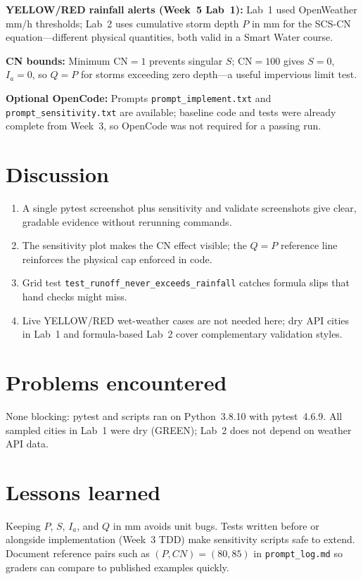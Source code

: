 \documentclass[11pt,a4paper]{article}
\begin{document}
\textbf{YELLOW/RED rainfall alerts (Week~5 Lab~1):} Lab~1 used OpenWeather mm/h thresholds; Lab~2 uses cumulative storm depth $P$ in mm for the SCS-CN equation---different physical quantities, both valid in a Smart Water course.

\textbf{CN bounds:} Minimum CN${=}1$ prevents singular $S$; CN${=}100$ gives $S{=}0$, $I_a{=}0$, so $Q{=}P$ for storms exceeding zero depth---a useful impervious limit test.

\textbf{Optional OpenCode:} Prompts \texttt{prompt\_implement.txt} and \texttt{prompt\_sensitivity.txt} are available; baseline code and tests were already complete from Week~3, so OpenCode was not required for a passing run.

\section{Discussion}
\begin{enumerate}[noitemsep]
  \item A single pytest screenshot plus sensitivity and validate screenshots give clear, gradable evidence without rerunning commands.
  \item The sensitivity plot makes the CN effect visible; the $Q=P$ reference line reinforces the physical cap enforced in code.
  \item Grid test \texttt{test\_runoff\_never\_exceeds\_rainfall} catches formula slips that hand checks might miss.
  \item Live YELLOW/RED wet-weather cases are not needed here; dry API cities in Lab~1 and formula-based Lab~2 cover complementary validation styles.
\end{enumerate}

\section{Problems encountered}
None blocking: pytest and scripts ran on Python~3.8.10 with pytest~4.6.9. All sampled cities in Lab~1 were dry (GREEN); Lab~2 does not depend on weather API data.

\section{Lessons learned}
Keeping $P$, $S$, $I_a$, and $Q$ in mm avoids unit bugs. Tests written before or alongside implementation (Week~3 TDD) make sensitivity scripts safe to extend. Document reference pairs such as $(P,CN)=(80,85)$ in \texttt{prompt\_log.md} so graders can compare to published examples quickly.
\end{document}
